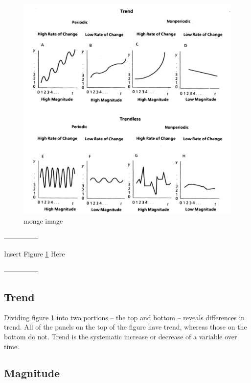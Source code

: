 \documentclass[english,,man]{apa6}
\theoremstyle{definition}
\theoremstyle{definition}
\theoremstyle{definition}
\theoremstyle{remark}
\begin{document}
\begin{figure}
\centering
\includegraphics{figs/unnamed-chunk-10-1.pdf}
\caption{\label{fig:unnamed-chunk-10}monge image\label{monge}}
\end{figure}

\begin{center}

---------------

Insert Figure \ref{monge} Here

---------------

\end{center}

\hypertarget{trend}{%
\subsection{Trend}\label{trend}}

Dividing figure \ref{monge} into two portions -- the top and bottom --
reveals differences in trend. All of the panels on the top of the figure
have trend, whereas those on the bottom do not. Trend is the systematic
increase or decrease of a variable over time.

\hypertarget{magnitude}{%
\subsection{Magnitude}\label{magnitude}}
\end{document}
